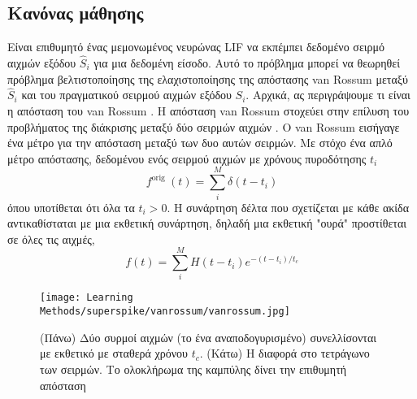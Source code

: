 \documentclass[12pt]{report}
\begin{document}
\subsection{Κανόνας μάθησης}
Είναι επιθυμητό ένας μεμονωμένος νευρώνας \textlatin{LIF} να εκπέμπει δεδομένο σειρμό αιχμών εξόδου $\hat{S}_{i}$ για μια δεδομένη είσοδο. Αυτό το πρόβλημα μπορεί να θεωρηθεί πρόβλημα βελτιστοποίησης της ελαχιστοποίησης της απόστασης \textlatin{van Rossum} \cite{rossum2001} μεταξύ $\hat{S}_{i}$ και του πραγματικού σειρμού αιχμών εξόδου $S_{i}$. Αρχικά, ας περιγράψουμε τι είναι η απόσταση του \textlatin{van Rossum} . Η απόσταση \textlatin{van Rossum} στοχεύει στην επίλυση του προβλήματος της διάκρισης μεταξύ δύο σειρμών αιχμών . Ο  \textlatin{van Rossum} εισήγαγε ένα μέτρο για την απόσταση μεταξύ των δυο αυτών σειρμών.
Με στόχο ένα απλό μέτρο απόστασης, δεδομένου ενός σειρμού αιχμών με χρόνους πυροδότησης $t_{i}$
\begin{equation}
f^{\text {orig }}(t)=\sum_{i}^{M} \delta\left(t-t_{i}\right)
\end{equation}
όπου υποτίθεται ότι όλα τα $t_{i}>0$. Η συνάρτηση δέλτα που σχετίζεται με κάθε ακίδα αντικαθίσταται με μια εκθετική συνάρτηση, δηλαδή μια εκθετική "ουρά" προστίθεται σε όλες τις αιχμές,
\begin{equation}
f(t)=\sum_{i}^{M} H\left(t-t_{i}\right) e^{-\left(t-t_{i}\right) / t_{c}}
\end{equation}
\begin{figure}[htp]
    \centering
    \texttt{[image: Learning Methods/superspike/vanrossum/vanrossum.jpg]}
    \caption{(Πάνω) Δύο συρμοί αιχμών (το ένα αναποδογυρισμένο) συνελλίσονται με εκθετικό με σταθερά χρόνου $t_{c}$. (Κάτω) Η διαφορά στο τετράγωνο των σειρμών. Το ολοκλήρωμα της καμπύλης δίνει την επιθυμητή απόσταση
    \cite{rossum2001}
}
    \label{fig:vanrossum}
\end{figure}
\end{document}
